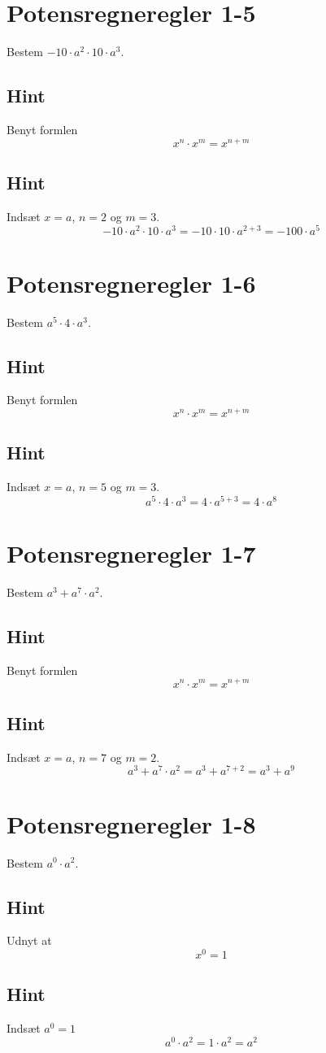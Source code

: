 \documentclass{article}
\newenvironment{exercise}[1]{\newpage\section{#1}}{}
\newcommand{\answerbox}[1]{\fbox{$#1$}}
\newcommand{\hint}{\subsection*{Hint}}
\begin{document}
\newpage

\begin{exercise}{Potensregneregler 1-5}
	
	Bestem $-10 \cdot a^2 \cdot 10 \cdot a^3$.
	
	\answerbox{-100 \cdot a^5}
	
	\hint
	
	Benyt formlen
	\[
	x^n \cdot x^m = x^{n+m}
	\]
	
	\hint
	
	Indsæt $x=a$, $n=2$ og $m=3$.
	\[
	-10 \cdot a^2 \cdot 10 \cdot a^3 = -10 \cdot 10 \cdot a^{2+3} =  -100 \cdot a^5
	\]
	
\end{exercise}

\newpage

\begin{exercise}{Potensregneregler 1-6}
	
	Bestem $a^5 \cdot 4 \cdot  a^3$.
	
	\answerbox{4 \cdot a^8}
	
	\hint
	
	Benyt formlen
	\[
	x^n \cdot x^m = x^{n+m}
	\]
	
	\hint
	
	Indsæt $x=a$, $n=5$ og $m=3$.
	\[
	a^5 \cdot 4 \cdot a^3 = 4 \cdot a^{5+3} = 4 \cdot a^8
	\]
	
\end{exercise}

\newpage

\begin{exercise}{Potensregneregler 1-7}
	
	Bestem $a^3 + a^7 \cdot a^2$.
	
	\answerbox{a^3 + a^9}
	
	\hint
	
	Benyt formlen
	\[
	x^n \cdot x^m = x^{n+m}
	\]
	
	\hint
	
	Indsæt $x=a$, $n=7$ og $m=2$.
	\[
	a^3 + a^7 \cdot a^2 = a^3 + a^{7+2} = a^3 + a^9
	\]
	
\end{exercise}

\newpage

\begin{exercise}{Potensregneregler 1-8}
	
	Bestem $a^0 \cdot a^2$.
	
	\answerbox{a^2}
	
	\hint
	
	Udnyt at
	\[
	x^0 = 1
	\]
	
	\hint
	
	Indsæt $a^0=1$
	\[
	a^0 \cdot a^2 = 1 \cdot a^2 = a^2
	\]
	
\end{exercise}
\end{document}
